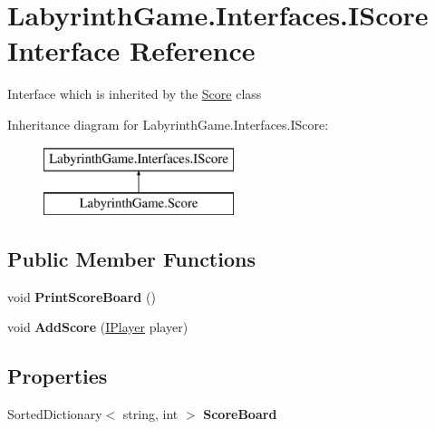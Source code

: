 \hypertarget{interface_labyrinth_game_1_1_interfaces_1_1_i_score}{\section{Labyrinth\+Game.\+Interfaces.\+I\+Score Interface Reference}
\label{interface_labyrinth_game_1_1_interfaces_1_1_i_score}
}


Interface which is inherited by the \hyperlink{class_labyrinth_game_1_1_score}{Score} class  


Inheritance diagram for Labyrinth\+Game.\+Interfaces.\+I\+Score\+:\begin{figure}[H]
\begin{center}
\leavevmode
\includegraphics[height=2.000000cm]{interface_labyrinth_game_1_1_interfaces_1_1_i_score}
\end{center}
\end{figure}
\subsection*{Public Member Functions}
\begin{DoxyCompactItemize}
\item 
\hypertarget{interface_labyrinth_game_1_1_interfaces_1_1_i_score_adbb9c4d1b98d5c198bb4bad7af6ffa32}{void {\bfseries Print\+Score\+Board} ()}\label{interface_labyrinth_game_1_1_interfaces_1_1_i_score_adbb9c4d1b98d5c198bb4bad7af6ffa32}

\item 
\hypertarget{interface_labyrinth_game_1_1_interfaces_1_1_i_score_a7f58318fb964f105a7dc3f9020e07822}{void {\bfseries Add\+Score} (\hyperlink{interface_labyrinth_game_1_1_interfaces_1_1_i_player}{I\+Player} player)}\label{interface_labyrinth_game_1_1_interfaces_1_1_i_score_a7f58318fb964f105a7dc3f9020e07822}

\end{DoxyCompactItemize}
\subsection*{Properties}
\begin{DoxyCompactItemize}
\item 
\hypertarget{interface_labyrinth_game_1_1_interfaces_1_1_i_score_a5c21c141ce25c24c8b1a388068c9843c}{Sorted\+Dictionary$<$ string, int $>$ {\bfseries Score\+Board}}\label{interface_labyrinth_game_1_1_interfaces_1_1_i_score_a5c21c141ce25c24c8b1a388068c9843c}

\end{DoxyCompactItemize}


